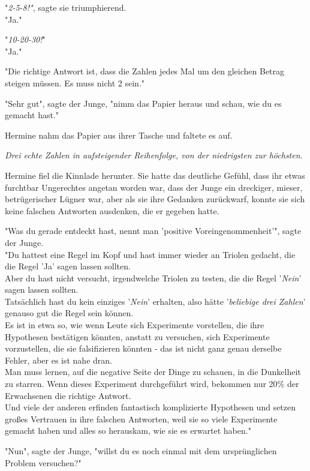 {"\emph{2-5-8!"}, sagte sie triumphierend.\\ "Ja."

"\emph{10-20-30!}"\\ "Ja."

"Die richtige Antwort ist, dass die Zahlen jedes Mal um den gleichen Betrag steigen müssen. Es muss nicht 2 sein."

"Sehr gut", sagte der Junge, "nimm das Papier heraus und schau, wie du es gemacht hast."

Hermine nahm das Papier aus ihrer Tasche und faltete es auf.

\emph{Drei echte Zahlen in aufsteigender Reihenfolge, von der niedrigsten zur höchsten.}

Hermine fiel die Kinnlade herunter. Sie hatte das deutliche Gefühl, dass ihr etwas furchtbar Ungerechtes angetan worden war, dass der Junge ein dreckiger, mieser, betrügerischer Lügner war, aber als sie ihre Gedanken zurückwarf, konnte sie sich keine falschen Antworten ausdenken, die er gegeben hatte.

"Was du gerade entdeckt hast, nennt man 'positive Voreingenommenheit'", sagte der Junge.\\ "Du hattest eine Regel im Kopf und hast immer wieder an Triolen gedacht, die die Regel 'Ja' sagen lassen sollten.\\ Aber du hast nicht versucht, irgendwelche Triolen zu testen, die die Regel '\emph{Nein}' sagen lassen sollten.\\ Tatsächlich hast du kein einziges '\emph{Nein}' erhalten, also hätte '\emph{beliebige drei Zahlen}' genauso gut die Regel sein können.\\ Es ist in etwa so, wie wenn Leute sich Experimente vorstellen, die ihre Hypothesen bestätigen könnten, anstatt zu versuchen, sich Experimente vorzustellen, die sie falsifizieren könnten - das ist nicht ganz genau derselbe Fehler, aber es ist nahe dran.\\ Man muss lernen, auf die negative Seite der Dinge zu schauen, in die Dunkelheit zu starren. Wenn dieses Experiment durchgeführt wird, bekommen nur 20\% der Erwachsenen die richtige Antwort.\\ Und viele der anderen erfinden fantastisch komplizierte Hypothesen und setzen großes Vertrauen in ihre falschen Antworten, weil sie so viele Experimente gemacht haben und alles so herauskam, wie sie es erwartet haben."

"Nun", sagte der Junge, "willst du es noch einmal mit dem ursprünglichen Problem versuchen?"

}
